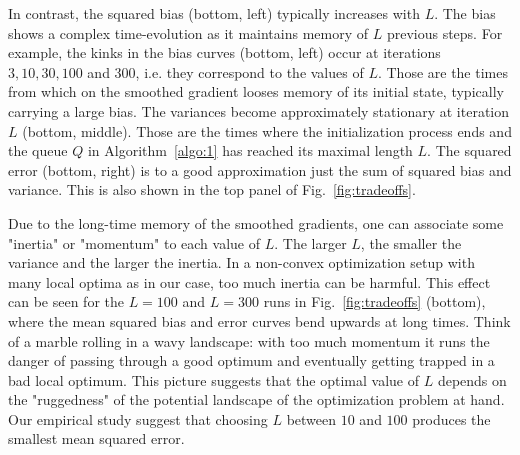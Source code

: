 \documentclass{article} %
\begin{document}
In contrast, the squared bias (bottom, left) typically increases with $L$. The bias shows a complex time-evolution as it maintains memory of $L$
previous steps.
For example, the kinks in the bias curves (bottom, left) occur at iterations $3,10,30,100$ and $300$, i.e. they correspond to
the values of $L$. Those are the times
from which on the smoothed gradient looses memory of its initial state, typically carrying a large bias.
The variances become approximately stationary at iteration $L$ (bottom, middle).
Those are the times where the initialization process ends and the queue $Q$ in Algorithm~\ref{algo:1} has reached its maximal length $L$.
The squared error (bottom, right) is to a good approximation just the sum of squared bias and variance. This is also shown in the top panel of Fig.~\ref{fig:tradeoffs}.

Due to the long-time memory of the smoothed gradients, one can associate some "inertia" or "momentum" to each value of $L$.
The larger $L$, the smaller the variance and the larger the inertia. In a non-convex optimization setup with many local optima as in our case,
too much inertia can be harmful. This effect can be seen for the $L=100$ and $L=300$
runs in Fig.~\ref{fig:tradeoffs} (bottom), where the mean squared bias and error curves bend upwards at long times.
Think of a marble rolling in a wavy landscape: with too much momentum it runs the danger of passing through a good
optimum and eventually getting trapped in a bad local optimum. This picture suggests that the optimal value of $L$ depends on the "ruggedness" of the potential landscape
of the optimization problem at hand. Our empirical study suggest that choosing $L$ between $10$ and $100$ produces the smallest mean squared error.
\end{document}
